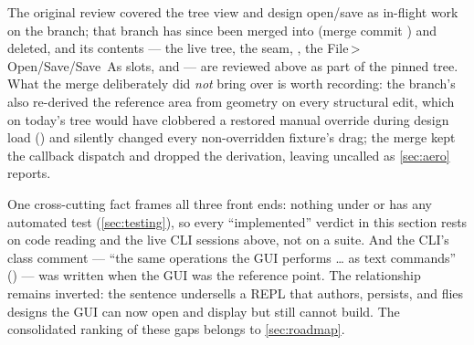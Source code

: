 The original review covered the tree view and design open/save as in-flight work on the
 branch; that branch has since been merged into
 (merge commit ) and deleted, and its contents --- the live
 tree, the  seam, ,
the File\,>\,Open/Save/Save~As slots, and  --- are
reviewed above as part of the pinned tree. What the merge deliberately did \emph{not} bring over
is worth recording: the branch's  also re-derived the reference
area from geometry on every structural edit, which on today's tree would have clobbered a restored
manual override during design load () and silently changed
every non-overridden fixture's drag; the merge kept the callback dispatch and dropped the
derivation, leaving  uncalled as \cref{sec:aero} reports.

One cross-cutting fact frames all three front ends: nothing under  or
 has any automated test (\cref{sec:testing}), so every ``implemented'' verdict in
this section rests on code reading and the live CLI sessions above, not on a suite. And the CLI's
class comment --- ``the same operations the GUI performs \ldots{} as text commands''
() --- was written when the GUI was the reference point. The relationship
remains inverted: the sentence undersells a REPL that authors, persists, and flies designs the GUI
can now open and display but still cannot build. The consolidated ranking of these gaps belongs to
\cref{sec:roadmap}.
